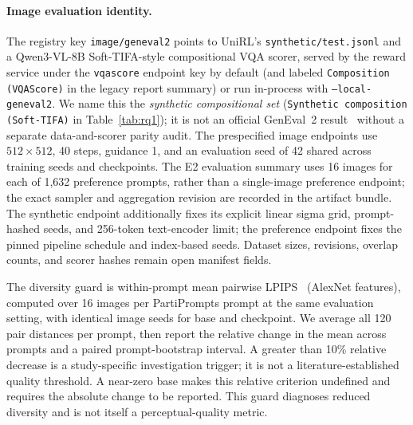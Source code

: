 \documentclass[10pt]{article}
\begin{document}
\paragraph{Image evaluation identity.}
The registry key \texttt{image/geneval2} points to UniRL's \texttt{synthetic/test.jsonl} and a Qwen3-VL-8B Soft-TIFA-style compositional VQA scorer, served by the reward service under the \texttt{vqascore} endpoint key by default (and labeled \texttt{Composition (VQAScore)} in the legacy report summary) or run in-process with \texttt{--local-geneval2}.
We name this the \emph{synthetic compositional set} (\texttt{Synthetic composition (Soft-TIFA)} in Table~\ref{tab:rq1}); it is not an official GenEval~2 result~\citep{kamath2025geneval2} without a separate data-and-scorer parity audit.
The prespecified image endpoints use $512\times512$, 40 steps, guidance 1, and an evaluation seed of 42 shared across training seeds and checkpoints.
The E2 evaluation summary uses 16 images for each of 1,632 preference prompts, rather than a single-image preference endpoint; the exact sampler and aggregation revision are recorded in the artifact bundle.
The synthetic endpoint additionally fixes its explicit linear sigma grid, prompt-hashed seeds, and 256-token text-encoder limit; the preference endpoint fixes the pinned pipeline schedule and index-based seeds.
Dataset sizes, revisions, overlap counts, and scorer hashes remain open manifest fields.

The diversity guard is within-prompt mean pairwise LPIPS~\citep{zhang2018lpips} (AlexNet features), computed over 16 images per PartiPrompts prompt at the same evaluation setting, with identical image seeds for base and checkpoint.
We average all 120 pair distances per prompt, then report the relative change in the mean across prompts and a paired prompt-bootstrap interval.
A greater than 10\% relative decrease is a study-specific investigation trigger; it is not a literature-established quality threshold. A near-zero base makes this relative criterion undefined and requires the absolute change to be reported.
This guard diagnoses reduced diversity and is not itself a perceptual-quality metric.

\begin{table}[H]
\caption{Reported E2 diffusion endpoints after 300 rollouts, with three training seeds. Changes are absolute score differences unless marked as relative percentages. Missing base/final levels are not reconstructed from differences.}
\label{tab:rq1}
\centering
\small

\end{table}
\end{document}
